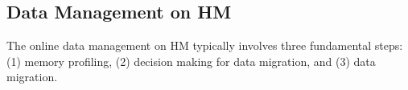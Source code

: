 \begin{comment}
Using CPU for training has the following four benefits. 
\textit{First}, compared with GPU, CPU is more approachable and affordable. Some data centers do not have GPU and simply use CPU for training. Such examples include the Cori in Lawrence Berkeley National Lab and \textcolor{red}{xxx} in TACC for scientific machine learning \textcolor{red}{xxx}. \textit{Second}, for those DNN models that lack thread level parallelism, GPU can perform worse than CPU. For example, training the wide-and-deep model \textcolor{red}{[xxx]} and DQN, CPU performs \textcolor{red}{[xxx]} faster than GPU (Using xxx CPU and xxx GPU for training, the training throughput is xxx and xxx respectively). \textit{Third}, on a public cloud, reserving CPU is cheaper than reserving GPU. When the training throughputs on CPU and GPU are comparable, using CPU can be easily more cost effective. \textit{Fourth}, the CPU-based machine provides a much larger memory capacity than the GPU one, allowing more use cases such as co-locating multiple DNN training workloads in a virtualization environment or automatic machine learning~\cite{}. 
\end{comment}



\vspace{-5pt}
\subsection{Data Management on HM}
\vspace{-1pt}
The online data management on HM typically involves three fundamental steps: (1) memory profiling, (2) decision making for data migration, and (3) data migration. 

